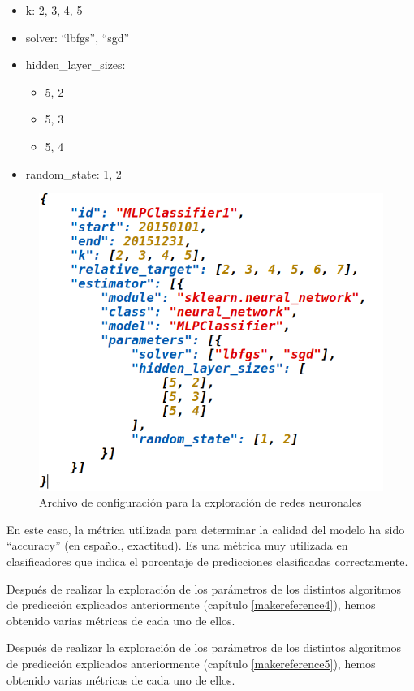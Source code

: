 \begin{itemize}
\item k: 2, 3, 4, 5
\item solver: ``lbfgs'', ``sgd''
\item hidden\_layer\_sizes:
	\begin{itemize}
	\item 5, 2
	\item 5, 3
	\item 5, 4
	\end{itemize}
\item random\_state: 1, 2
\end{itemize}

\begin{figure}[htb]
	\begin{center}
		\includegraphics[width=12cm]{figures/json_mlp.png}
		\caption{Archivo de configuración para la exploración de redes neuronales \label{json_mlp}}
	\end{center}
\end{figure}

En este caso, la métrica utilizada para determinar la calidad del modelo ha sido ``accuracy'' (en español, exactitud). Es una métrica muy utilizada en clasificadores que indica el porcentaje de predicciones clasificadas correctamente.

Después de realizar la exploración de los parámetros de los distintos algoritmos de predicción explicados anteriormente (capítulo \ref{makereference4}), hemos obtenido varias métricas de cada uno de ellos.

Después de realizar la exploración de los parámetros de los distintos algoritmos de predicción explicados anteriormente (capítulo \ref{makereference5}), hemos obtenido varias métricas de cada uno de ellos.

